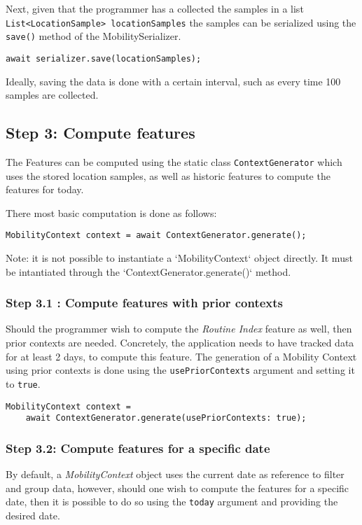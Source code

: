 Next, given that the programmer has a collected the samples in a list \verb|List<LocationSample> locationSamples| the samples can be serialized using the \verb|save()| method of the MobilitySerializer.

\begin{verbatim}
await serializer.save(locationSamples);
\end{verbatim}

Ideally, saving the data is done with a certain interval, such as every time 100 samples are collected. 

\subsection*{Step 3: Compute features}
The Features can be computed using the static class \verb|ContextGenerator| which uses the stored location samples, as well as  historic features to compute the features for today.

There most basic computation is done as follows:
\begin{verbatim}
MobilityContext context = await ContextGenerator.generate();
\end{verbatim}

Note: it is not possible to instantiate a `MobilityContext` object directly. 
It must be intantiated through the `ContextGenerator.generate()` method.

\subsubsection*{Step 3.1 : Compute features with prior contexts}
Should the programmer wish to compute the \textit{Routine Index} feature as well, then prior contexts are needed. Concretely, the application needs to have tracked data for at least 2 days, to compute this feature. The generation of a Mobility Context using prior contexts is done using the \verb|usePriorContexts| argument and setting it to \verb|true|.

\begin{verbatim}
MobilityContext context = 
    await ContextGenerator.generate(usePriorContexts: true);
\end{verbatim}

\subsubsection*{Step 3.2: Compute features for a specific date}
By default, a \textit{MobilityContext} object uses the current date as reference to filter and group data, however, should one wish to compute the features for a specific date, then it is possible to do so using the \verb|today| argument and providing the desired date.


